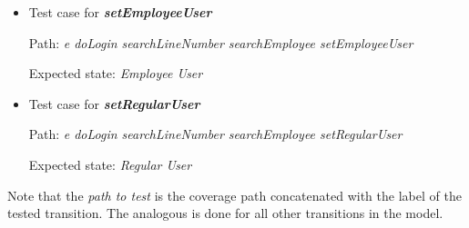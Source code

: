 \begin{itemize}

\item Test case for \textit{\textbf{setEmployeeUser}}

Path: \textit{e doLogin searchLineNumber searchEmployee setEmployeeUser}

Expected state: \textit{Employee User}

\item Test case for \textit{\textbf{setRegularUser}}

Path: \textit{e doLogin searchLineNumber searchEmployee setRegularUser}

Expected state: \textit{Regular User}
\end{itemize}

Note that the \textit{path to test} is the coverage path concatenated with the label of the tested transition. The analogous is done for all other transitions in the model.

